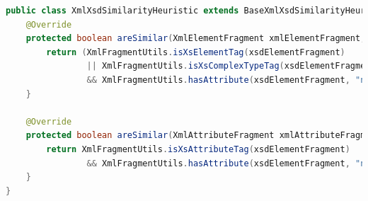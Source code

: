 \begin{lstlisting}[language=Java,caption={The XmlXsdSimilarityHeuristic class},label={listing:TheXmlXsdSimilarityHeuristicClass}]
public class XmlXsdSimilarityHeuristic extends BaseXmlXsdSimilarityHeuristic {
    @Override
    protected boolean areSimilar(XmlElementFragment xmlElementFragment, XmlElementFragment xsdElementFragment) {
        return (XmlFragmentUtils.isXsElementTag(xsdElementFragment)
                || XmlFragmentUtils.isXsComplexTypeTag(xsdElementFragment))
                && XmlFragmentUtils.hasAttribute(xsdElementFragment, "name", xmlElementFragment.getName());
    }

    @Override
    protected boolean areSimilar(XmlAttributeFragment xmlAttributeFragment, XmlElementFragment xsdElementFragment) {
        return XmlFragmentUtils.isXsAttributeTag(xsdElementFragment)
                && XmlFragmentUtils.hasAttribute(xsdElementFragment, "name", xmlAttributeFragment.getName());
    }
}
\end{lstlisting}

